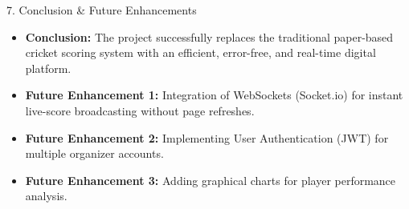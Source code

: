 \documentclass[12pt]{beamer}
\begin{document}
\begin{frame}{7. Conclusion \& Future Enhancements}
    \begin{itemize}
        \item \textbf{Conclusion:} The project successfully replaces the traditional paper-based cricket scoring system with an efficient, error-free, and real-time digital platform.
        \item \textbf{Future Enhancement 1:} Integration of WebSockets (Socket.io) for instant live-score broadcasting without page refreshes.
        \item \textbf{Future Enhancement 2:} Implementing User Authentication (JWT) for multiple organizer accounts.
        \item \textbf{Future Enhancement 3:} Adding graphical charts for player performance analysis.
    \end{itemize}
\end{frame}
\end{document}
